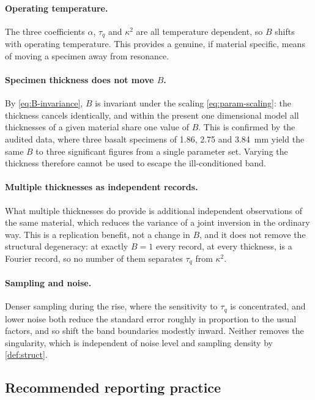\documentclass[preprint,12pt,a4paper]{elsarticle}
\theoremstyle{plain}
\theoremstyle{definition}
\theoremstyle{remark}
\newcommand{\tq}{\tau_{q}}
\newcommand{\kk}{\kappa^{2}}
\newcommand{\Bnum}{B}
\begin{document}
\paragraph{Operating temperature.}
The three coefficients $\alpha$, $\tq$ and $\kk$ are all temperature dependent,
so $\Bnum$ shifts with operating temperature. This provides a genuine, if
material specific, means of moving a specimen away from resonance.

\paragraph{Specimen thickness does not move $\Bnum$.}
By
\eqref{eq:B-invariance}, $\Bnum$ is invariant under the scaling
\eqref{eq:param-scaling}: the thickness cancels identically, and within the
present one dimensional model all thicknesses of a given material share one
value of $\Bnum$. This is confirmed by the audited data, where three basalt
specimens of \SI{1.86}{}, \SI{2.75}{} and \SI{3.84}{\milli\metre} yield the
same $\Bnum$ to three significant figures from a single parameter set. Varying
the thickness therefore cannot be used to escape the ill-conditioned band.

\paragraph{Multiple thicknesses as independent records.}
What multiple thicknesses do provide is additional independent observations of
the same material, which reduces the variance of a joint inversion in the
ordinary way. This is a replication benefit, not a change in $\Bnum$, and it
does not remove the structural degeneracy: at exactly $\Bnum = 1$ every record,
at every thickness, is a Fourier record, so no number of them separates $\tq$
from $\kk$.

\paragraph{Sampling and noise.}
Denser sampling during the rise, where the sensitivity to $\tq$ is
concentrated, and lower noise both reduce the standard error roughly in
proportion to the usual factors, and so shift the band boundaries modestly
inward. Neither removes the singularity, which is independent of noise level
and sampling density by \cref{def:struct}.

\subsection{Recommended reporting practice}
\label{sec:design-recommendation}
\end{document}
